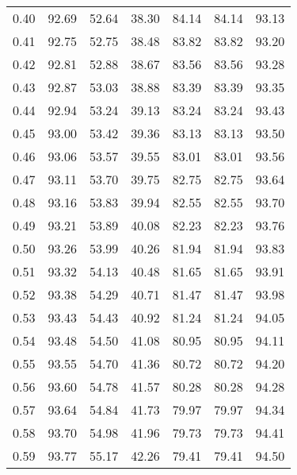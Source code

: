 \begin{tabular}{|c|c|c|c|c|c|c|}
      0.40 &     92.69 &     52.64 &      38.30 &   84.14 &      84.14 &         93.13 \\
      0.41 &     92.75 &     52.75 &      38.48 &   83.82 &      83.82 &         93.20 \\
      0.42 &     92.81 &     52.88 &      38.67 &   83.56 &      83.56 &         93.28 \\
      0.43 &     92.87 &     53.03 &      38.88 &   83.39 &      83.39 &         93.35 \\
      0.44 &     92.94 &     53.24 &      39.13 &   83.24 &      83.24 &         93.43 \\
      0.45 &     93.00 &     53.42 &      39.36 &   83.13 &      83.13 &         93.50 \\
      0.46 &     93.06 &     53.57 &      39.55 &   83.01 &      83.01 &         93.56 \\
      0.47 &     93.11 &     53.70 &      39.75 &   82.75 &      82.75 &         93.64 \\
      0.48 &     93.16 &     53.83 &      39.94 &   82.55 &      82.55 &         93.70 \\
      0.49 &     93.21 &     53.89 &      40.08 &   82.23 &      82.23 &         93.76 \\
      0.50 &     93.26 &     53.99 &      40.26 &   81.94 &      81.94 &         93.83 \\
      0.51 &     93.32 &     54.13 &      40.48 &   81.65 &      81.65 &         93.91 \\
      0.52 &     93.38 &     54.29 &      40.71 &   81.47 &      81.47 &         93.98 \\
      0.53 &     93.43 &     54.43 &      40.92 &   81.24 &      81.24 &         94.05 \\
      0.54 &     93.48 &     54.50 &      41.08 &   80.95 &      80.95 &         94.11 \\
      0.55 &     93.55 &     54.70 &      41.36 &   80.72 &      80.72 &         94.20 \\
      0.56 &     93.60 &     54.78 &      41.57 &   80.28 &      80.28 &         94.28 \\
      0.57 &     93.64 &     54.84 &      41.73 &   79.97 &      79.97 &         94.34 \\
      0.58 &     93.70 &     54.98 &      41.96 &   79.73 &      79.73 &         94.41 \\
      0.59 &     93.77 &     55.17 &      42.26 &   79.41 &      79.41 &         94.50 \\

\end{tabular}
